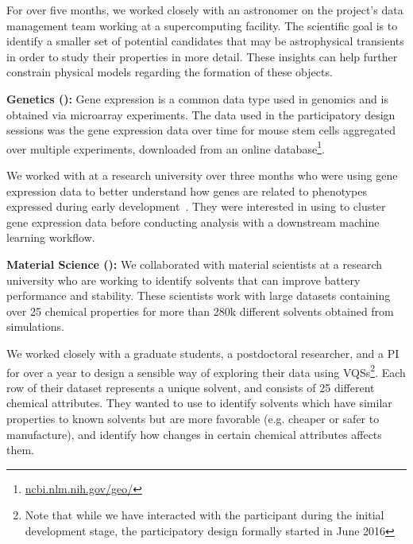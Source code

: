 For over five months, we worked closely with an astronomer on the project's data management team working at a supercomputing facility.  The scientific goal is to identify a smaller set of potential candidates that may be astrophysical transients in order to study their properties in more detail. These insights can help further constrain physical models regarding the formation of these objects.
\par \textbf{Genetics (\bio):} Gene expression is a common data type used in genomics and is obtained via microarray experiments.  The data used in the participatory design sessions was the gene expression data over time for mouse stem cells aggregated over multiple experiments, downloaded from an online database\footnote{\url{ncbi.nlm.nih.gov/geo/}}. 
\par  We worked with  at a research university over three months who were using gene expression data to better understand how genes are related to phenotypes expressed during early development~\cite{Peng2016,Gloss2017}. They were interested in using \zv to cluster gene expression data before conducting analysis with a downstream machine learning workflow. 
\par \textbf{Material Science (\matsci):} We collaborated with material scientists at a research university who are working to identify solvents that can improve battery performance and stability. These scientists work with large datasets containing over 25 chemical properties for more than 280k different solvents obtained from simulations. 
\par We worked closely with a graduate students, a postdoctoral researcher, and a PI for over a year to design a sensible way of exploring their data using VQSs\footnote{Note that while we have interacted with the \matsci participant during the initial development stage, the participatory design formally started in June 2016}. Each row of their dataset represents a unique solvent, and consists of 25 different chemical attributes. They wanted to use \zv to identify solvents which have similar properties to known solvents but are more favorable (e.g. cheaper or safer to manufacture), and identify how changes in certain chemical attributes affects them.
\raggedbottom

